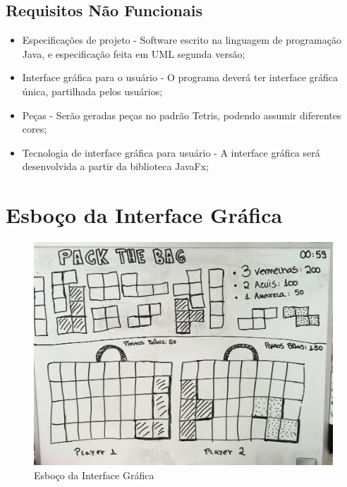 \documentclass[
	12pt,	
	openany,			
	oneside,			
	a4paper,			
	english,			
	french,			
	spanish,			
	brazil,	
	]{abntex2}
\begin{document}
\section{Requisitos Não Funcionais}
\begin{itemize}
\item Especificações de projeto - Software escrito na linguagem de programação Java, e especificação feita em UML segunda versão;
\item Interface gráfica para o usuário - O programa deverá ter interface gráfica única, partilhada pelos usuários;
\item Peças - Serão geradas peças no padrão Tetris, podendo assumir diferentes cores;
\item Tecnologia de interface gráfica para usuário - A interface gráfica será desenvolvida a partir da biblioteca JavaFx;
\end{itemize}

\chapter{Esboço da Interface Gráfica}
\begin{figure}[H]
  \includegraphics[width=\linewidth]{File_000.jpeg}
  \caption{Esboço da Interface Gráfica}
  \centering
  \label{fig:esboco}
\end{figure}


 
\end{document}
